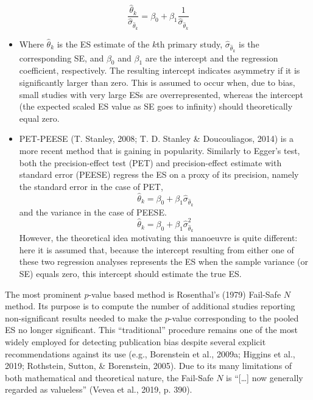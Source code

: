 \documentclass[
  man,floatsintext]{apa6}
\providecommand{\tightlist}{%
  \setlength{\itemsep}{0pt}\setlength{\parskip}{0pt}}
\begin{document}
\[
\frac{\hat\theta_k}{\hat\sigma_{\hat\theta_k}} = \beta_0 + \beta_1 \frac{1}{\hat\sigma_{\hat\theta_k}}
\tag{6}
\]

\begin{itemize} \item[] Where $\hat\theta_k$ is the ES estimate of the $k$th primary study, $\hat\sigma_{\hat\theta_k}$ is the corresponding SE, and $\beta_0$ and $\beta_1$ are the intercept and the regression coefficient, respectively. The resulting intercept indicates asymmetry if it is significantly larger than zero. This is assumed to occur when, due to bias, small studies with very large ESs are overrepresented, whereas the intercept (the expected scaled ES value as SE goes to infinity) should theoretically equal zero. \end{itemize}

\begin{itemize}
\tightlist
\item
  PET-PEESE (T. Stanley, 2008; T. D. Stanley \& Doucouliagos, 2014) is a more recent method that is gaining in popularity. Similarly to Egger's test, both the precision-effect test (PET) and precision-effect estimate with standard error (PEESE) regress the ES on a proxy of its precision, namely the standard error in the case of PET,
  \[
  \hat\theta_k =  \beta_0 + \beta_1\hat\sigma_{\hat\theta_k}
  \tag{7}
  \]
  and the variance in the case of PEESE.
  \[
  \hat\theta_k =  \beta_0 + \beta_1\hat\sigma_{\hat\theta_k}^2
  \tag{8}
  \]
  However, the theoretical idea motivating this manoeuvre is quite different: here it is assumed that, because the intercept resulting from either one of these two regression analyses represents the ES when the sample variance (or SE) equals zero, this intercept should estimate the true ES.
\end{itemize}

The most prominent \(p\)-value based method is Rosenthal's (1979) Fail-Safe \(N\) method. Its purpose is to compute the number of additional studies reporting non-significant results needed to make the \(p\)-value corresponding to the pooled ES no longer significant. This ``traditional'' procedure remains one of the most widely employed for detecting publication bias despite several explicit recommendations against its use (e.g., Borenstein et al., 2009a; Higgins et al., 2019; Rothstein, Sutton, \& Borenstein, 2005). Due to its many limitations of both mathematical and theoretical nature, the Fail-Safe \(N\) is ``{[}\ldots{]} now generally regarded as valueless'' (Vevea et al., 2019, p. 390).
\end{document}
